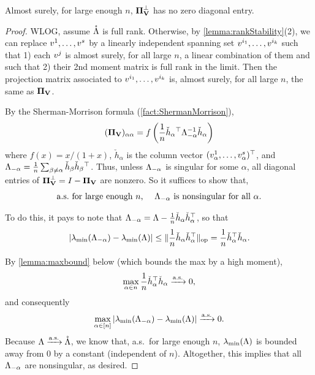 \documentclass[main.tex]{subfiles}
\begin{document}
\begin{lemma}\label{lemma:PiCheckHDiagonal}
Almost surely, for large enough $n$, $\boldsymbol{\Pi}_{\mathbf{V}}^\perp$ has no zero diagonal entry.
\end{lemma}
\begin{proof}

WLOG, assume $\mathring{\Lambda }$ is full rank.
Otherwise, by \cref{lemma:rankStability}(2), we can replace $v^1,\ldots, v^s$ by a linearly independent spanning set $v^{i_1}, \ldots, v^{i_k}$ such that 1) each $v^j$ is almost surely, for all large $n$, a linear combination of them and such that 2) their 2nd moment matrix is full rank in the limit.
Then the projection matrix associated to $v^{i_1}, \ldots, v^{i_k}$ is, almost surely, for all large $n$, the same as $\boldsymbol{\Pi}_{\mathbf{V}}$.

By the Sherman-Morrison formula (\cref{fact:ShermanMorrison}),
\begin{equation*}
(\boldsymbol{\Pi}_{\mathbf{V}})_{\alpha\alpha}
    =
        f\left( \frac{1}{n} \check h_\alpha{}^\top \Lambda_{-\alpha}^{-1} \check h_\alpha\right)
\end{equation*}
where $f(x) = x/(1+x)$, $\check h_\alpha$ is the column vector $(v^1_\alpha, \ldots, v^s_\alpha)^\top$,
and $\Lambda_{-\alpha} = \frac{1}{n} \sum_{\beta \ne \alpha} \check h_\beta \check h_\beta{}^\top$.
Thus, unless $\Lambda_{-\alpha}$ is singular for some $\alpha$, all diagonal entries of $\boldsymbol{\Pi}_{\mathbf{V}}^\perp = I - \boldsymbol{\Pi}_{\mathbf{V}}$ are nonzero.
So it suffices to show that, 
\begin{equation*}
\text{a.s.\ for large enough $n$, \quad $\Lambda_{-\alpha}$ is nonsingular for all $\alpha$.}
\end{equation*}

To do this, it pays to note that $\Lambda_{-\alpha} = \Lambda  - \frac{1}{n} \check h_\alpha \check h_\alpha^\top$, so that
\[|\lambda_{\mathrm{min}}(\Lambda_{-\alpha}) - \lambda_{\mathrm{min}}(\Lambda )| \le \|\frac{1}{n} \check h_\alpha \check h_\alpha^\top\|_{\mathrm{op}} = \frac{1}{n} \check h_\alpha^\top \check h_\alpha.\]

By \cref{lemma:maxbound} below (which bounds the max by a high moment),
\[\max_{\alpha \in n} \frac{1}{n} \check h_\alpha^\top \check h_\alpha \xrightarrow{\mathrm{a.s.}} 0,\]
and consequently
\[\max_{\alpha \in [n]} |\lambda_{\mathrm{min}}(\Lambda_{-\alpha}) - \lambda_{\mathrm{min}}(\Lambda )| \xrightarrow{\mathrm{a.s.}} 0.\]
Because $\Lambda  \xrightarrow{\mathrm{a.s.}} \mathring{\Lambda }$, we know that, a.s.\ for large enough $n$, $\lambda_{\mathrm{min}}(\Lambda )$ is bounded away from 0 by a constant (independent of $n$).
Altogether, this implies that all $\Lambda_{-\alpha}$ are nonsingular, as desired.
\end{proof}
\end{document}

